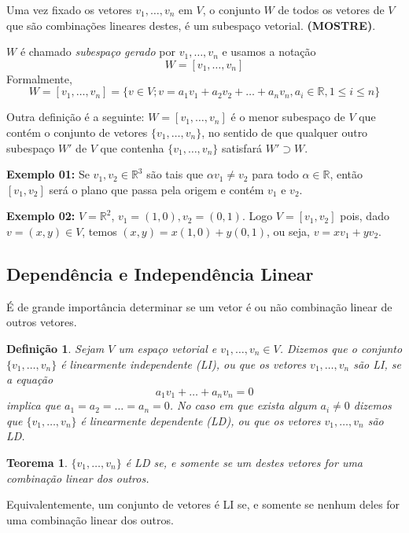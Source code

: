 \documentclass[oneside,a4paper,12pt]{article}
\newtheorem{theorem}{Teorema}[section]
\newtheorem{definition}{Definição}[section]
\begin{document}
Uma vez fixado os vetores $v_1, \dots, v_n$ em $V$, o conjunto $W$ de todos os vetores de $V$ que são combinações lineares destes, é um subespaço vetorial. {\bf (MOSTRE)}.

$W$ é chamado \emph{subespaço gerado} por $v_1, \dots, v_n$ e usamos a notação
$$W = [v_1, \dots, v_n]$$
Formalmente,
$$W = [v_1, \dots, v_n] = \{ v \in V; v = a_1 v_1 + a_2 v_2 + \dots + a_n v_n, a_i \in \mathbb{R}, 1 \leq i \leq n   \}$$

Outra definição é a seguinte: $W = [v_1, \dots, v_n]$ é o menor subespaço de $V$ que contém o conjunto de vetores $\{ v_1, \dots, v_n \}$, no sentido de que qualquer outro subespaço $W'$ de $V$ que contenha $\{ v_1, \dots, v_n \}$ satisfará $W' \supset W$.

{\bf Exemplo 01:} Se $v_1 , v_2 \in \mathbb{R}^3$ são tais que $\alpha v_1 \neq v_2$ para todo $\alpha \in \mathbb{R}$, então $[v_1, v_2]$ será o plano que passa pela origem e contém $v_1$ e $v_2$.

{\bf Exemplo 02:} $V = \mathbb{R}^2$, $v_1 = (1,0), v_2 = (0,1)$. Logo $V = [v_1 , v_2]$ pois, dado $v = (x,y) \in V$, temos $(x,y) = x(1,0) + y(0,1)$, ou seja, $v = xv_1 + yv_2$.

\subsection{Dependência e Independência Linear}

É de grande importância determinar se um vetor é ou não combinação linear de outros vetores.

\begin{definition}
	Sejam $V$ um espaço vetorial e $v_1 , \dots, v_n \in V$. Dizemos que o conjunto $\{ v_1, \dots, v_n \}$ é \emph{linearmente independente} (LI), ou que os vetores $v_1, \dots, v_n$ são LI, se a equação
	$$a_1 v_1 + \dots + a_n v_n = 0$$
	implica que $a_1 = a_2 = \dots = a_n = 0$. No caso em que exista algum $a_i \neq 0$ dizemos que $\{ v_1, \dots, v_n \}$ é \emph{linearmente dependente} (LD), ou que os vetores $v_1, \dots, v_n$ são LD.
\end{definition}


\begin{theorem}
	$\{ v_1, \dots, v_n \}$ é LD se, e somente se um destes vetores for uma combinação linear dos outros.
\end{theorem}

Equivalentemente, um conjunto de vetores é LI se, e somente se nenhum deles for uma combinação linear dos outros.
\end{document}
